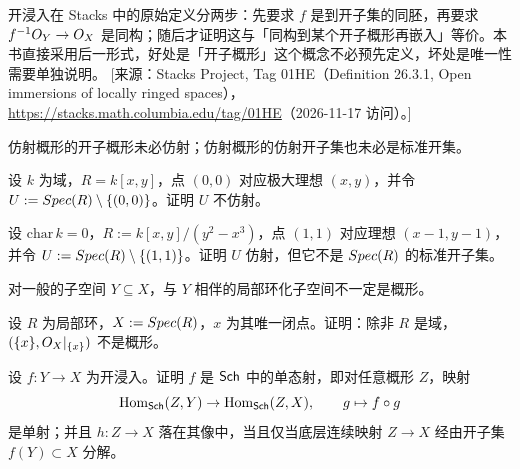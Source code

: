 \begin{yizhu}
开浸入在 Stacks 中的原始定义分两步：先要求 $f$ 是到开子集的同胚，再要求 $f^{-1}O_Y\to O_X$ 是同构；随后才证明这与「同构到某个开子概形再嵌入」等价。本书直接采用后一形式，好处是「开子概形」这个概念不必预先定义，坏处是唯一性需要单独说明。
[来源：Stacks Project, Tag 01HE（Definition 26.3.1, Open immersions of locally ringed spaces），\url{https://stacks.math.columbia.edu/tag/01HE}（2026-11-17 访问）。]
\end{yizhu}

\begin{warning}\label{warn:5.3.3}
仿射概形的开子概形未必仿射；仿射概形的仿射开子集也未必是标准开集。
\end{warning}

\begin{exercise}\label{exc:5.3.4}
设 $k$ 为域，$R=k[x,y]$，点 $(0,0)$ 对应极大理想 $(x,y)$，并令 $U:=Spec(R)\setminus\{(0,0)\}$。证明 $U$ 不仿射。
\end{exercise}

\begin{exercise}\label{exc:5.3.5}
设 $\mathrm{char}\,k=0$，$R:=k[x,y]/(y^2-x^3)$，点 $(1,1)$ 对应理想 $(x-1,y-1)$，并令 $U:=Spec(R)\setminus\{(1,1)\}$。证明 $U$ 仿射，但它不是 $Spec(R)$ 的标准开子集。
\end{exercise}

\begin{warning}\label{warn:5.3.6}
对一般的子空间 $Y\subseteq X$，与 $Y$ 相伴的局部环化子空间不一定是概形。
\end{warning}

\begin{exercise}\label{exc:5.3.7}
设 $R$ 为局部环，$X:=Spec(R)$，$x$ 为其唯一闭点。证明：除非 $R$ 是域，$(\{x\},O_X|_{\{x\}})$ 不是概形。
\end{exercise}

\begin{exercise}\label{exc:5.3.8}
设 $f:Y\to X$ 为开浸入。证明 $f$ 是 $\mathsf{Sch}$ 中的单态射，即对任意概形 $Z$，映射
\[
\operatorname{Hom}_{\mathsf{Sch}}(Z,Y)\to\operatorname{Hom}_{\mathsf{Sch}}(Z,X),\qquad g\mapsto f\circ g
\]
是单射；并且 $h:Z\to X$ 落在其像中，当且仅当底层连续映射 $Z\to X$ 经由开子集 $f(Y)\subset X$ 分解。
\end{exercise}

